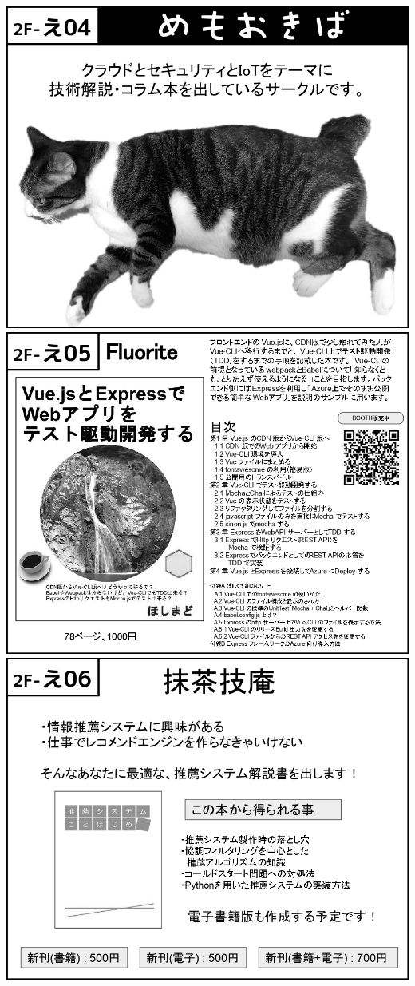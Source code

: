 \begin{center}
\includegraphics[width=0.9\linewidth]{images/circle-appeals/2F-え04.jpg}
\includegraphics[width=0.9\linewidth]{images/circle-appeals/2F-え05.jpg}
\includegraphics[width=0.9\linewidth]{images/circle-appeals/2F-え06.jpg}

\end{center}
